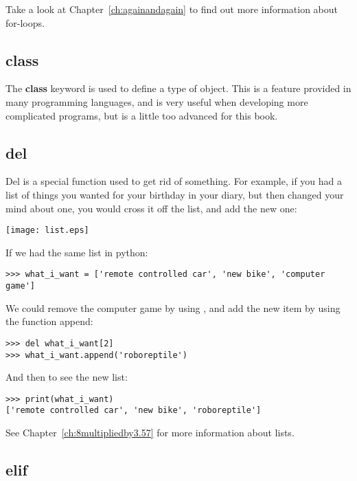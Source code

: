 \noindent
Take a look at Chapter~\ref{ch:againandagain} to find out more information about for-loops.

\subsection*{class}

The \textbf{class} keyword is used to define a type of object. This is a feature provided in many programming languages, and is very useful when developing more complicated programs, but is a little too advanced for this book.

\subsection*{del}

Del is a special function used to get rid of something. For example, if you had a list of things you wanted for your birthday in your diary, but then changed your mind about one, you would cross it off the list, and add the new one:

\begin{center}
\texttt{[image: list.eps]}
\end{center}

\noindent
If we had the same list in python:

\begin{Verbatim}[frame=single]
>>> what_i_want = ['remote controlled car', 'new bike', 'computer game']
\end{Verbatim}

\noindent
We could remove the computer game by using , and add the new item by using the function append:

\begin{Verbatim}[frame=single]
>>> del what_i_want[2]
>>> what_i_want.append('roboreptile')
\end{Verbatim}

\noindent
And then to see the new list:

\begin{Verbatim}[frame=single]
>>> print(what_i_want)
['remote controlled car', 'new bike', 'roboreptile']
\end{Verbatim}

\noindent
See Chapter~\ref{ch:8multipliedby3.57} for more information about lists.

\subsection*{elif}

